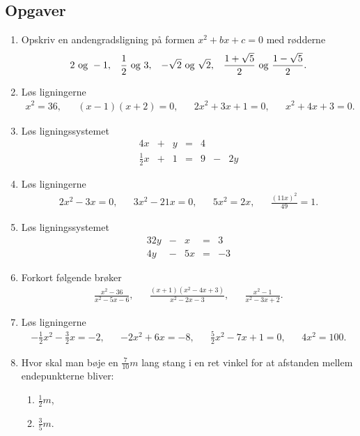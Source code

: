 \subsection{Opgaver}

 \begin{enumerate}
\item 	Opskriv en andengradsligning på formen $x^2+bx+c=0$ med rødderne
\begin{align*}
2 \textup{ og } -1,&& \frac{1}{2} \textup{ og } 3,&&  -\sqrt{2} \textup{ og } \sqrt{2},&& \frac{1+\sqrt{5}}{2} \textup{ og } \frac{1-\sqrt{5}}{2}.
\end{align*}

\item Løs ligningerne
\begin{align*}
x^2=36,&&(x-1)(x+2)=0,&& 2x^2+3x+1=0,&& x^2+4x+3=0.
\end{align*}

\item Løs ligningssystemet
\begin{alignat*}{4}
x& {}+{}&y & {}={}& 4\\
\frac{1}{2}x& {}+{}&1&{}={}& 9& {}-{}&2y
\end{alignat*}

\item Løs ligningerne
\begin{align*}
2x^2-3x=0,&& 3x^2-21x=0,&& 5x^2=2x,&& \frac{(11x)^2}{49}= 1.
\end{align*}

\item Løs ligningssystemet 
\begin{alignat*}{3}
2y&{}-{}&x&{}={}&3\\
4y&{}-{}&5x&{}={}&-3
\end{alignat*}

\item Forkort følgende brøker
\begin{align*}
\frac{x^2-36}{x^2-5x-6},&& \frac{(x+1)(x^2-4x+3)}{x^2-2x-3},&&\frac{x^2-1}{x^2-3x+2}.
\end{align*}


\item Løs ligningerne
\begin{align*}
-\frac{1}{2}x^2- \frac{3}{2}x=-2,&& -2x^2+6x=-8,&& \frac{5}{2}x^2 -7x+1=0,&& 4x^2=100.
\end{align*}



\item Hvor skal man bøje en $\frac{7}{10} m$ lang stang i en ret vinkel for at afstanden mellem endepunkterne bliver:
\begin{enumerate}
\item $\frac{1}{2} m$,
\item $\frac{3}{5} m$.
\end{enumerate}


\end{enumerate}
